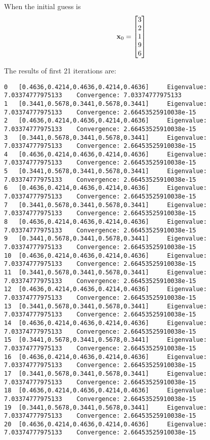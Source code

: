 \documentclass{article}
\begin{document}
\begin{enumerate}
When the initial guess is 
\begin{align}
\boldsymbol{\mathrm{x}}_0=\begin{bmatrix} 3\\ 2 \\ 1 \\ 9 \\ 6 \end{bmatrix}
\end{align}

The results of first 21 iterations are: 
\begin{verbatim}
0	[0.4636,0.4214,0.4636,0.4214,0.4636]	 Eigenvalue: 7.03374777975133	 Convergence: 7.03374777975133
1	[0.3441,0.5678,0.3441,0.5678,0.3441]	 Eigenvalue: 7.03374777975133	 Convergence: 2.66453525910038e-15
2	[0.4636,0.4214,0.4636,0.4214,0.4636]	 Eigenvalue: 7.03374777975133	 Convergence: 2.66453525910038e-15
3	[0.3441,0.5678,0.3441,0.5678,0.3441]	 Eigenvalue: 7.03374777975133	 Convergence: 2.66453525910038e-15
4	[0.4636,0.4214,0.4636,0.4214,0.4636]	 Eigenvalue: 7.03374777975133	 Convergence: 2.66453525910038e-15
5	[0.3441,0.5678,0.3441,0.5678,0.3441]	 Eigenvalue: 7.03374777975133	 Convergence: 2.66453525910038e-15
6	[0.4636,0.4214,0.4636,0.4214,0.4636]	 Eigenvalue: 7.03374777975133	 Convergence: 2.66453525910038e-15
7	[0.3441,0.5678,0.3441,0.5678,0.3441]	 Eigenvalue: 7.03374777975133	 Convergence: 2.66453525910038e-15
8	[0.4636,0.4214,0.4636,0.4214,0.4636]	 Eigenvalue: 7.03374777975133	 Convergence: 2.66453525910038e-15
9	[0.3441,0.5678,0.3441,0.5678,0.3441]	 Eigenvalue: 7.03374777975133	 Convergence: 2.66453525910038e-15
10	[0.4636,0.4214,0.4636,0.4214,0.4636]	 Eigenvalue: 7.03374777975133	 Convergence: 2.66453525910038e-15
11	[0.3441,0.5678,0.3441,0.5678,0.3441]	 Eigenvalue: 7.03374777975133	 Convergence: 2.66453525910038e-15
12	[0.4636,0.4214,0.4636,0.4214,0.4636]	 Eigenvalue: 7.03374777975133	 Convergence: 2.66453525910038e-15
13	[0.3441,0.5678,0.3441,0.5678,0.3441]	 Eigenvalue: 7.03374777975133	 Convergence: 2.66453525910038e-15
14	[0.4636,0.4214,0.4636,0.4214,0.4636]	 Eigenvalue: 7.03374777975133	 Convergence: 2.66453525910038e-15
15	[0.3441,0.5678,0.3441,0.5678,0.3441]	 Eigenvalue: 7.03374777975133	 Convergence: 2.66453525910038e-15
16	[0.4636,0.4214,0.4636,0.4214,0.4636]	 Eigenvalue: 7.03374777975133	 Convergence: 2.66453525910038e-15
17	[0.3441,0.5678,0.3441,0.5678,0.3441]	 Eigenvalue: 7.03374777975133	 Convergence: 2.66453525910038e-15
18	[0.4636,0.4214,0.4636,0.4214,0.4636]	 Eigenvalue: 7.03374777975133	 Convergence: 2.66453525910038e-15
19	[0.3441,0.5678,0.3441,0.5678,0.3441]	 Eigenvalue: 7.03374777975133	 Convergence: 2.66453525910038e-15
20	[0.4636,0.4214,0.4636,0.4214,0.4636]	 Eigenvalue: 7.03374777975133	 Convergence: 2.66453525910038e-15
\end{verbatim}


\end{enumerate}
\end{document}
